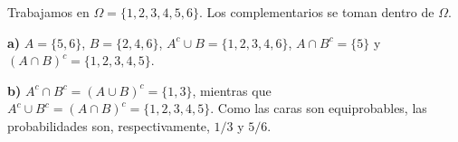 Trabajamos en $\Omega=\{1,2,3,4,5,6\}$. Los complementarios se toman dentro de $\Omega$.

\textbf{a)} $A=\{5,6\}$, $B=\{2,4,6\}$, $A^c\cup B=\{1,2,3,4,6\}$, $A\cap B^c=\{5\}$ y $(A\cap B)^c=\{1,2,3,4,5\}$.

\textbf{b)} $A^c\cap B^c=(A\cup B)^c=\{1,3\}$, mientras que $A^c\cup B^c=(A\cap B)^c=\{1,2,3,4,5\}$. Como las caras son equiprobables, las probabilidades son, respectivamente, $\boxed{1/3}$ y $\boxed{5/6}$.
